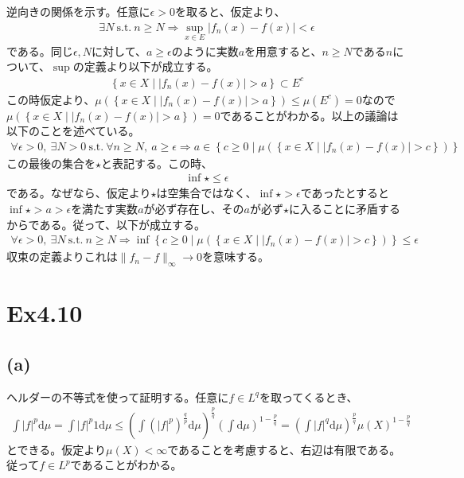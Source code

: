 \documentclass{article}
\begin{document}
逆向きの関係を示す。任意に$\epsilon > 0$を取ると、仮定より、
\begin{align*}
	\exists N\ \text{s.t.}\ n\geq N \Rightarrow \sup_{x\in E} |f_n(x) - f(x)| < \epsilon
\end{align*}
である。同じ$\epsilon,N$に対して、$a \geq \epsilon$のように実数$a$を用意すると、$n \geq N$である$n$について、$\sup$の定義より以下が成立する。
\begin{align*}
	\left\{ x\in X \mid |f_n(x) -f(x)| > a \right\} \subset E^c
\end{align*}
この時仮定より、$\mu(\left\{ x\in X \mid |f_n(x) -f(x)| > a \right\}) \leq \mu(E^c) = 0$なので$\mu(\left\{ x\in X \mid |f_n(x) -f(x)| > a \right\}) = 0$であることがわかる。以上の議論は以下のことを述べている。
\begin{align*}
	\forall \epsilon > 0,\ \exists N > 0\ \text{s.t.}\ \forall n \geq N,\ a \geq \epsilon \Rightarrow a \in \left\{ c \geq 0 \mid \mu\left( \left\{ x \in X \mid |f_n(x) - f(x)| > c \right\} \right) \right\}
\end{align*}
この最後の集合を$\star$と表記する。この時、
\begin{align*}
	\inf \star \leq \epsilon
\end{align*}
である。なぜなら、仮定より$\star$は空集合ではなく、$\inf \star > \epsilon$であったとすると$\inf \star > a > \epsilon$を満たす実数$a$が必ず存在し、その$a$が必ず$\star$に入ることに矛盾するからである。従って、以下が成立する。
\begin{align*}
	\forall \epsilon > 0,\ \exists N\ \text{s.t.}\ n\geq N \Rightarrow \inf \left\{ c \geq 0 \mid \mu\left( \left\{ x \in X \mid |f_n(x) - f(x)| > c \right\} \right) \right\} \leq \epsilon
\end{align*}
収束の定義よりこれは$\| f_n -f \|_{\infty} \to 0$を意味する。



\section{Ex4.10}
\subsection{(a)}
ヘルダーの不等式を使って証明する。任意に$f \in L^q$を取ってくるとき、
\begin{align*}
	\int |f|^p \mathrm{d}\mu = \int |f|^p 1 \mathrm{d}\mu \leq \left( \int \left(|f|^p \right)^{\frac{q}{p}} \mathrm{d}\mu \right)^{\frac{p}{q}} \left( \int \mathrm{d}\mu\right)^{1-\frac{p}{q}} =  \left( \int |f|^q \mathrm{d}\mu \right)^{\frac{p}{q}}\mu \left( X \right)^{1-\frac{p}{q}}
\end{align*}
とできる。仮定より$\mu(X) < \infty$であることを考慮すると、右辺は有限である。従って$f \in L^p$であることがわかる。
\end{document}
